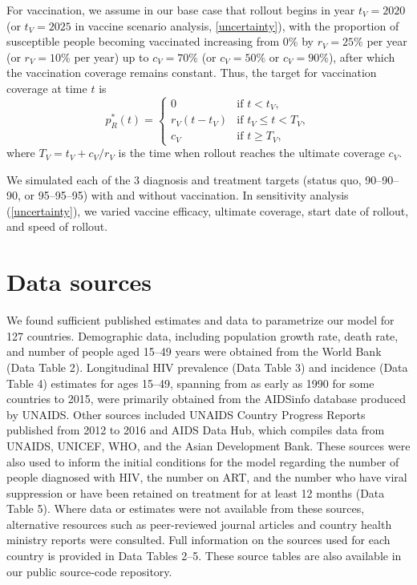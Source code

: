 \documentclass{article}
\begin{document}
For vaccination, we assume in our base case that rollout begins in
year $t_V = 2020$ (or $t_V = 2025$ in vaccine scenario analysis,
\autoref{uncertainty}), with the proportion of susceptible people
becoming vaccinated increasing from 0\% by $r_V = 25\%$ per year (or
$r_V = 10\%$ per year) up to $c_V = 70\%$ (or $c_V = 50\%$ or
$c_V = 90\%$), after which the vaccination coverage remains constant.
Thus, the target for vaccination coverage at time $t$ is
\begin{equation}
  \label{vaccination_target}
  p_R^*(t) =
  \begin{cases}
    0 & \text{if $t < t_V$},
    \\
    r_V (t - t_V) & \text{if $t_V \leq t < T_V$},
    \\
    c_V & \text{if $t \geq T_V$},
  \end{cases}
\end{equation}
where $T_V = t_V + c_V / r_V$ is the time when rollout reaches
the ultimate coverage $c_V$.

We simulated each of the 3 diagnosis and treatment targets (status
quo, 90--90--90, or 95--95--95) with and without vaccination.  In
sensitivity analysis (\autoref{uncertainty}), we varied vaccine
efficacy, ultimate coverage, start date of rollout, and speed of
rollout.


\section{Data sources}
\label{data_sources}

We found sufficient published estimates and data to parametrize our
model for 127 countries.  Demographic data, including population
growth rate,\cite{WorldBankpg} death
rate,\cite{World_Development_Indicators2013-ee} and number of people
aged 15--49 years\cite{The_World_Bank2016-fd} were obtained from the
World Bank (Data Table 2). Longitudinal HIV prevalence
(Data Table 3) and incidence (Data Table 4)
estimates for ages 15--49, spanning from as early as 1990 for some
countries to 2015, were primarily obtained from the AIDSinfo database
produced by UNAIDS.\cite{Unaids2016-an} Other sources included UNAIDS
Country Progress Reports\cite{Unaids2016-am} published from 2012 to
2016 and AIDS Data Hub,\cite{AIDSdatahub-fg} which compiles data from
UNAIDS, UNICEF, WHO, and the Asian Development Bank.  These sources
were also used to inform the initial conditions for the model
regarding the number of people diagnosed with HIV, the number on ART,
and the number who have viral suppression or have been retained on
treatment for at least 12 months (Data Table 5).  Where data
or estimates were not available from these sources, alternative
resources such as peer-reviewed journal articles and country health
ministry reports were consulted.  Full information on the sources used
for each country is provided in Data Tables 2--5.  These
source tables are also available in our public source-code
repository.\cite{medlock2016-git}
\end{document}
